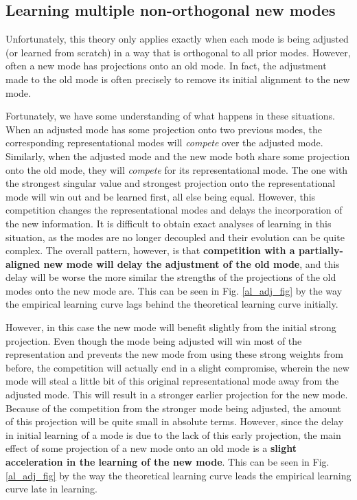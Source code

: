 \documentclass{article}
\begin{document}
\subsection{Learning multiple non-orthogonal new modes}
Unfortunately, this theory only applies exactly when each mode is being adjusted (or learned from scratch) in a way that is orthogonal to all prior modes. However, often a new mode has projections onto an old mode. In fact, the adjustment made to the old mode is often precisely to remove its initial alignment to the new mode. \par 
Fortunately, we have some understanding of what happens in these situations. When an adjusted mode has some projection onto two previous modes, the corresponding representational modes will \emph{compete} over the adjusted mode. Similarly, when the adjusted mode and the new mode both share some projection onto the old mode, they will \emph{compete} for its representational mode. The one with the strongest singular value and strongest projection onto the representational mode will win out and be learned first, all else being equal. However, this competition changes the representational modes and delays the incorporation of the new information. It is difficult to obtain exact analyses of learning in this situation, as the modes are no longer decoupled and their evolution can be quite complex. The overall pattern, however, is that \textbf{competition with a partially-aligned new mode will delay the adjustment of the old mode}, and this delay will be worse the more similar the strengths of the projections of the old modes onto the new mode are. This can be seen in Fig. \ref{al_adj_fig} by the way the empirical learning curve lags behind the theoretical learning curve initially. \par
However, in this case the new mode will benefit slightly from the initial strong projection. Even though the mode being adjusted will win most of the representation and prevents the new mode from using these strong weights from before, the competition will actually end in a slight compromise, wherein the new mode will steal a little bit of this original representational mode away from the adjusted mode. This will result in a stronger earlier projection for the new mode. Because of the competition from the stronger mode being adjusted, the amount of this projection will be quite small in absolute terms. However, since the delay in initial learning of a mode is due to the lack of this early projection, the main effect of some projection of a new mode onto an old mode is a \textbf{slight acceleration in the learning of the new mode}. This can be seen in Fig. \ref{al_adj_fig} by the way the theoretical learning curve leads the empirical learning curve late in learning. \par
\end{document}

